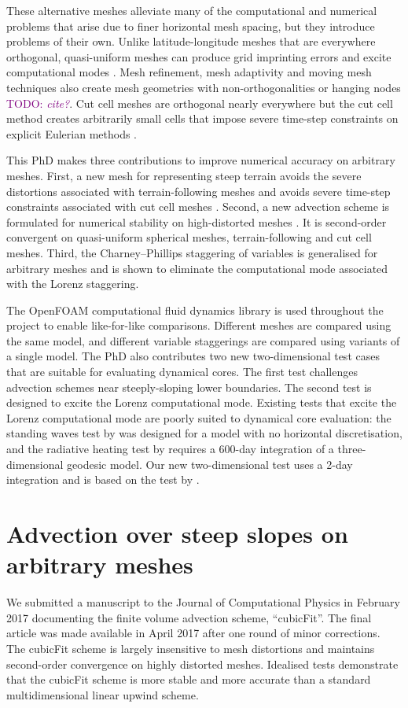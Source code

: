 \documentclass[a4paper,11pt]{article}
\newcommand{\TODO}[1]{\textcolor{purple}{TODO: \emph{#1}}}
\begin{document}
These alternative meshes alleviate many of the computational and numerical problems that arise due to finer horizontal mesh spacing, but they introduce problems of their own.
Unlike latitude-longitude meshes that are everywhere orthogonal, quasi-uniform meshes can produce grid imprinting errors and excite computational modes \citep{weller2012}.
Mesh refinement, mesh adaptivity and moving mesh techniques also create mesh geometries with non-orthogonalities or hanging nodes \TODO{cite?}.
Cut cell meshes are orthogonal nearly everywhere but the cut cell method creates arbitrarily small cells that impose severe time-step constraints on explicit Eulerian methods \citep{klein2009}.

This PhD makes three contributions to improve numerical accuracy on arbitrary meshes.  First, a new mesh for representing steep terrain avoids the severe distortions associated with terrain-following meshes and avoids severe time-step constraints associated with cut cell meshes \citep{shaw-weller2016}.  Second, a new advection scheme is formulated for numerical stability on high-distorted meshes \citep{shaw2017}.  It is second-order convergent on quasi-uniform spherical meshes, terrain-following and cut cell meshes.
Third, the Charney--Phillips staggering of variables is generalised for arbitrary meshes and is shown to eliminate the computational mode associated with the Lorenz staggering.

The OpenFOAM computational fluid dynamics library is used throughout the project to enable like-for-like comparisons.  Different meshes are compared using the same model, and different variable staggerings are compared using variants of a single model.
The PhD also contributes two new two-dimensional test cases that are suitable for evaluating dynamical cores.  The first test challenges advection schemes near steeply-sloping lower boundaries.
The second test is designed to excite the Lorenz computational mode.  Existing tests that excite the Lorenz computational mode are poorly suited to dynamical core evaluation: the standing waves test by \citet{arakawa-konor1996} was designed for a model with no horizontal discretisation, and the radiative heating test by \cite{untch-hortal2004} requires a 600-day integration of a three-dimensional geodesic model.  Our new two-dimensional test uses a 2-day integration and is based on the test by \citet{arakawa-konor1996}.


\section{Advection over steep slopes on arbitrary meshes}
We submitted a manuscript to the Journal of Computational Physics in February 2017 documenting the finite volume advection scheme, ``cubicFit''.  The final article \citep{shaw2017} was made available in April 2017 after one round of minor corrections.  The cubicFit scheme is largely insensitive to mesh distortions and maintains second-order convergence on highly distorted meshes.  Idealised tests demonstrate that the cubicFit scheme is more stable and more accurate than a standard multidimensional linear upwind scheme.
\end{document}

